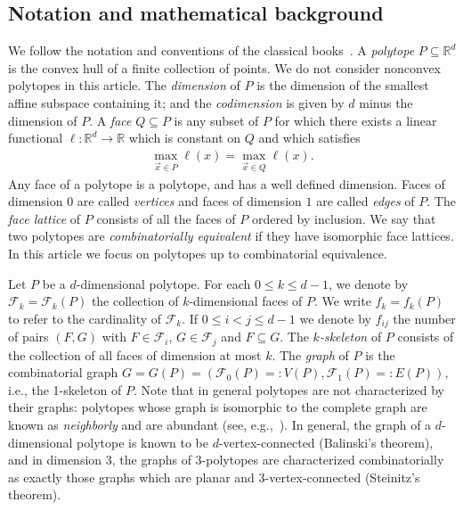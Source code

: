 \documentclass[11pt,a4paper]{amsart}
\begin{document}
\subsection{Notation and mathematical background}
We follow the notation and conventions of the classical books~\cite{Grunbaum,Ziegler}.
A \emph{polytope} $P\subseteq\mathbb{R}^d$ is the convex hull of a finite collection of points. We do not consider nonconvex polytopes in this article. 
The \emph{dimension} of $P$ is the dimension of the smallest affine subspace containing it; and the \emph{codimension} is given by $d$ minus the dimension of $P$. A \emph{face} $Q\subseteq P$ is any subset of $P$ for which there exists a linear functional $\ell: \mathbb{R}^d\to \mathbb{R}$ which is constant on $Q$ and which satisfies
    \begin{align*}
        \max_{\vec{x}\in P}\ell(x) = \max_{\vec{x}\in Q}\ell(x).
    \end{align*}
Any face of a polytope is a polytope, and has a well defined dimension. Faces of dimension $0$ are called \emph{vertices} and faces of dimension $1$ are called \emph{edges} of $P$. The \emph{face lattice} of $P$ consists of all the faces of $P$ ordered by inclusion. We say that two polytopes are \emph{combinatorially equivalent} if they have isomorphic face lattices. In this article we focus on polytopes up to combinatorial equivalence.

Let $P$ be a $d$-dimensional polytope. For each $0\leq k \leq d-1$, we denote by $\mathcal{F}_k = \mathcal{F}_k(P)$ the collection of $k$-dimensional faces of $P$. We write $f_k = f_k(P)$ to refer to the cardinality of $\mathcal{F}_k$. If $0\le i <j\le d-1$ we denote by $f_{ij}$ the number of pairs $(F,G)$ with $F\in \mathcal{F}_i$, $G\in \mathcal{F}_j$ and $F\subseteq G$. The \emph{$k$-skeleton} of $P$ consists of the collection of all faces of dimension at most $k$. The \emph{graph} of $P$ is the combinatorial graph $G=G(P) = (\mathcal{F}_0(P) =: V(P), \mathcal{F}_1(P) =:E(P) )$, i.e., the 1-skeleton of $P$. Note that in general polytopes are not characterized by their graphs: polytopes whose graph is isomorphic to the complete graph are known as \emph{neighborly} and are abundant (see, e.g.,~\cite[Ch. 8]{Ziegler}). In general, the graph of a $d$-dimensional polytope is known to be $d$-vertex-connected (Balinski's theorem), and in dimension $3$, the graphs of $3$-polytopes are characterized combinatorially as exactly those graphs which are planar and 3-vertex-connected (Steinitz's theorem).
\end{document}
